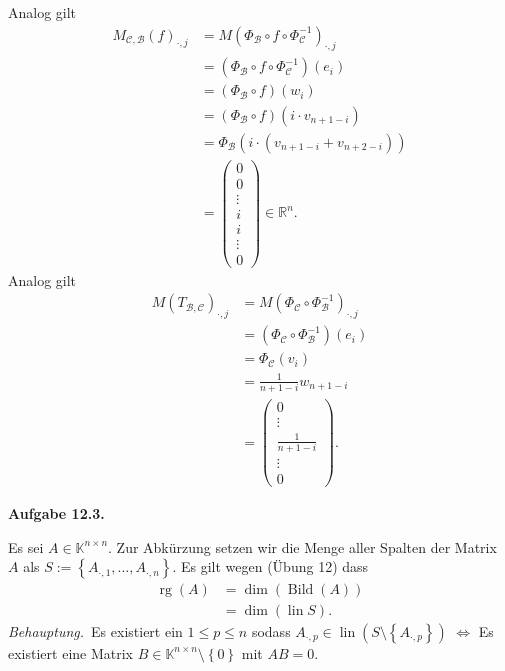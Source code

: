 \documentclass[12pt]{extarticle}
\newcommand{\mg}[1]{\mathbb{#1}}
\newcommand{\mc}[1]{\mathcal{#1}}
\newcommand{\lin}{\operatorname{lin}}
\newcommand{\aufgn}[1]{\textbf{Aufgabe #1.}}
\newcommand{\beh}{\textit{Behauptung.}\ }
\newcommand{\Bild}{\operatorname{Bild}}
\newcommand{\rg}{\operatorname{rg}}
\begin{document}
Analog gilt
\begin{align*}
  M_{\mc{C}, \mc{B}}(f)_{\cdot , j}
  &= M(\Phi_{\mc{B}} \circ f \circ
    \Phi_{\mc{C}}^{-1})_{\cdot, j} \\
  &= (\Phi_{\mc{B}} \circ f \circ
    \Phi_{\mc{C}}^{-1})(e_i) \\
  &= (\Phi_{\mc{B}} \circ f)(w_i) \\
  &= (\Phi_{\mc{B}} \circ f)(i \cdot v_{n+1 - i}) \\
  &= \Phi_{\mc{B}}(i \cdot (v_{n+1-i} + v_{n+2-i})) \\
  &=
\begin{pmatrix}
  0 \\
  0 \\
  \vdots \\
  i \\
  i \\
  \vdots \\
  0
\end{pmatrix} \in \mg{R}^n.
\end{align*}
Analog gilt
\begin{align*}
  M(T_{\mc{B}, \mc{C}})_{\cdot, j}
  &= M(\Phi_{\mc{C}} \circ
    \Phi_{\mc{B}}^{-1})_{\cdot, j} \\
  &= (\Phi_{\mc{C}} \circ
    \Phi_{\mc{B}}^{-1})(e_i) \\
  &= \Phi_{\mc{C}}(v_i) \\
  &= \frac{1}{n+1-i}w_{n+1-i} \\
  &=
\begin{pmatrix}
  0 \\
  \vdots \\
  \frac{1}{n+1-i} \\
  \vdots \\
  0
\end{pmatrix}.
\end{align*}

\newpage

\aufgn{12.3}

Es sei \(A \in \mg{K}^{n \times n}\).  Zur Abkürzung
setzen wir die Menge aller Spalten der Matrix \(A\) als
$S := \left\{ A_{\cdot, 1}, \ldots, A_{\cdot, n}
\right\}$. Es gilt wegen (Übung 12) dass
\begin{align*}
  \rg(A) &= \dim (\Bild (A)) \\
         &= \dim (\lin S).
\end{align*}
\beh Es existiert ein \(1 \le p \le n\) sodass
\(A_{\cdot, p} \in \lin (S \setminus \left\{ A_{\cdot, p} \right\})\)
\(\iff\) Es existiert eine Matrix
\(B \in \mg{K}^{n \times n} \setminus \left\{ 0 \right\}\)
mit \(AB = 0\).
\end{document}
